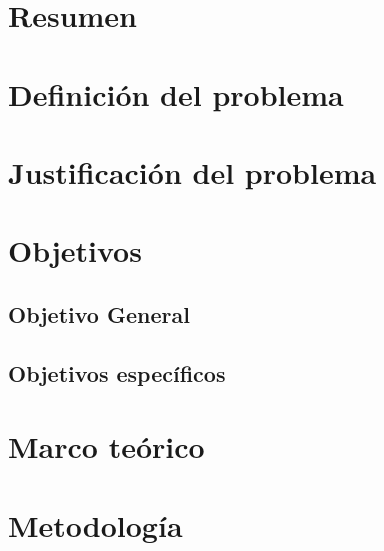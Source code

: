 \documentclass[letter,12pt]{book}
\begin{document}
  \newpage
  \mbox{}
  \thispagestyle{empty} %
  
  
  \chapter*{Resumen} %
  
  \tableofcontents %

  \cleardoublepage
  \listoffigures %

  \cleardoublepage
  \listoftables %
  
  \chapter{Definición del problema}
  
  
  \chapter{Justificación del problema}
  
  \chapter{Objetivos}
  \section{Objetivo General}
  \section{Objetivos específicos}
  
  \chapter{Marco teórico}
  
  
  
  \chapter{Metodología}
  
\end{document}
